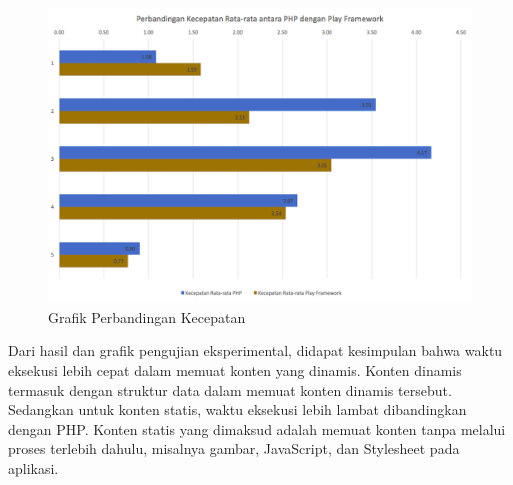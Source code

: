 \begin{figure}[H]
	\centering
	\includegraphics[scale=0.4]{Gambar/grafik-eksperimental}
	\caption{Grafik Perbandingan Kecepatan} 
	\label{fig:5_grafik_eksperimental}
\end{figure}

Dari hasil dan grafik pengujian eksperimental, didapat kesimpulan bahwa waktu eksekusi \play lebih cepat dalam memuat konten yang dinamis. Konten dinamis termasuk dengan struktur data dalam memuat konten dinamis tersebut. Sedangkan untuk konten statis, waktu eksekusi \play lebih lambat dibandingkan dengan PHP. Konten statis yang dimaksud adalah memuat konten tanpa melalui proses terlebih dahulu, misalnya gambar, JavaScript, dan Stylesheet pada aplikasi.
